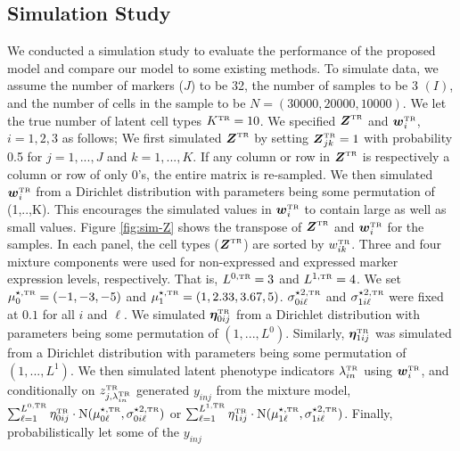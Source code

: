 \documentclass[12pt,]{article}
\newcommand{\N}{ \mathcal{N} }
\def\bet{\bm{\eta}}
\def\N{\text{N}}
\newcommand{\true}{{\mbox{\tiny TR}}}
\newcommand{\bZ}{\mbox{\boldmath $Z$}}
\newcommand{\bw}{\mbox{\boldmath $w$}}
\begin{document}
\subsection{Simulation Study}\label{sec:CB-sim} %
We conducted a simulation study to evaluate the performance of the proposed
model and compare our model to some existing methods.
To simulate data, we assume the number of markers ($J$) to be 32, 
the number of samples to be 3 $(I)$, and the number of cells in the sample to
be $N=(30000, 20000, 10000)$.  We let the true number of latent cell types
$K^\true=10$.  We specified $\bZ^\true$ and $\bw^\true_i$, $i=1,2,3$ as
follows; We first simulated $\bZ^\true$ by setting $\bZ^\true_{jk}=1$ with
probability 0.5 for $j=1,...,J$ and $k=1,...,K$. If any column or row in
$\bZ^\true$ is respectively a column or row of only 0's, the entire matrix is
re-sampled.
We then simulated $\bw^\true_i$ from a Dirichlet distribution with parameters
being some permutation of (1,..,K). This encourages the simulated values
in $\bw^\true_i$ to contain large as well as small values.
%
Figure \ref{fig:sim-Z} shows the transpose of $\bZ^\true$ and $\bw^\true_i$ for
the samples. In each panel, the cell types ($\bZ^\true$) are sorted by
$w_{ik}^\true$.  Three and four mixture components were used for non-expressed
and expressed marker expression levels, respectively. That is, $L^{0, \true}=3$
and $L^{1, \true}=4$. We set  $\mu^{\star, \true}_{0} = (-1, -3, -5)$ and
$\mu^{\star, \true}_{1} = (1, 2.33, 3.67, 5)$.  $\sigma^{\star 2,
\true}_{0i\ell}$ and $\sigma^{\star 2,\true}_{1i\ell}$ were fixed at $0.1$ for
all $i$ and $\ell$.
%
We simulated $\bet_{0ij}^\true$ from a Dirichlet distribution with
parameters being some permutation of $(1,...,L^0)$. Similarly, 
$\bet_{1ij}^\true$ was simulated from a Dirichlet distribution with
parameters being some permutation of $(1,...,L^1)$.
%
We then simulated latent phenotype indicators $\lambda_{in}^\true$ using
$\bw_i^\true$, and conditionally on $z^\true_{j,\lambda_{in}^\true}$ generated
$y_{inj}$ from the mixture model, $\sum_{\ell=1}^{L^{0,\true}}
\eta^\true_{0ij}\cdot\N(\mu^{\star, \true}_{0\ell}, \sigma^{\star 2,
\true}_{0i\ell})$ or $\sum_{\ell=1}^{L^{1,\true}}
\eta^\true_{1ij}\cdot\N(\mu^{\star, \true}_{1\ell}, \sigma^{\star 2,
\true}_{1i\ell})$.   Finally, probabilistically let some of the $y_{inj}$
\end{document}
